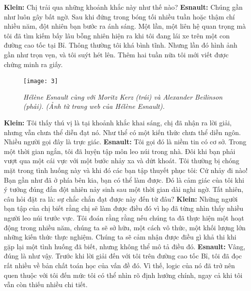 \begin{multicols}{2}
	\vskip 0.1cm
	\textbf{\color{doithoaitoanhoc}Klein:} Chị trải qua những khoảnh khắc này như thế nào?
	\vskip 0.1cm
	\textbf{\color{doithoaitoanhoc}Esnault:} Chúng gần như luôn gây bất ngờ. Sau khi đứng trong bóng tối nhiều tuần hoặc thậm chí nhiều năm, đột nhiên bạn bước ra ánh sáng. Một lần, một liên hệ quan trọng mà tôi đã tìm kiếm bấy lâu bỗng nhiên hiện ra khi tôi đang lái xe trên một con đường cao tốc tại Bỉ. Thông thường tôi khá bình tĩnh. Nhưng lần đó hình ảnh gần như trọn vẹn, và tôi suýt hét lên. Thêm hai tuần nữa tôi mới viết được chứng minh ra giấy.
	\begin{figure}[H]
		\centering
		\vspace*{-5pt}
		\captionsetup{labelformat= empty, justification=centering}
		\texttt{[image: 3]}
		\caption{\small\textit{\color{doithoaitoanhoc}Hélène Esnault cùng với Moritz Kerz (trái) và Alexander Beilinson (phải). (Ảnh từ trang web của Hélène Esnault).}}
		\vspace*{-10pt}
	\end{figure}
	\textbf{\color{doithoaitoanhoc}Klein:} Tôi thấy thú vị là tại khoảnh khắc khai sáng, chị đã nhận ra lời giải, nhưng vẫn chưa thể diễn đạt nó. Như thể có một kiến thức chưa thể diễn ngôn. Nhiều người gọi đây là trực giác.
	\vskip 0.1cm
	\textbf{\color{doithoaitoanhoc}Esnault:} Tôi gọi đó là niềm tin có cơ sở. Trong một thời gian ngắn, tôi đã luyện tập môn leo núi trong nhà. Đôi khi bạn phải vượt qua một cái vực với một bước nhảy xa và dứt khoát. Tôi thường bị chóng mặt trong tình huống này và khi đó các bạn tập thuyết phục tôi: Cứ nhảy đi nào! Bạn gần như đã ở phía bên kia, bạn có thể làm được. Đó là cảm giác của tôi khi ý tưởng đúng đắn đột nhiên nảy \linebreak sinh sau một thời gian dài nghi ngờ. Tất nhiên, câu hỏi đặt ra là: sự chắc chắn đạt được này đến từ đâu?
	\vskip 0.1cm
	\textbf{\color{doithoaitoanhoc}Klein:} Những người bạn tập của chị biết rằng chị sẽ làm được điều đó vì họ đã từng nhìn thấy nhiều người leo núi trước vực. Tôi đoán rằng rằng nếu chúng ta đã thực hiện một hoạt động trong nhiều năm, chúng ta sẽ sở hữu, một cách vô thức, một khối lượng lớn những kiến thức thực nghiệm. Chúng ta sẽ cảm nhận được điều gì khả thi khi gặp lại một tình huống đã biết, nhưng không thể mô tả điều đó.
	\vskip 0.1cm
	\textbf{\color{doithoaitoanhoc}Esnault:} Vâng, đúng là như vậy. Trước khi lời giải đến với tôi trên đường cao tốc Bỉ, tôi đã đọc rất nhiều về bản chất toán học của vấn đề đó. Vì thế, logic của nó đã trở nên quen thuộc với tôi đến mức tôi có thể nhìn rõ định hướng chính, ngay cả khi tôi vẫn còn thiếu nhiều chi tiết.

\end{multicols}
